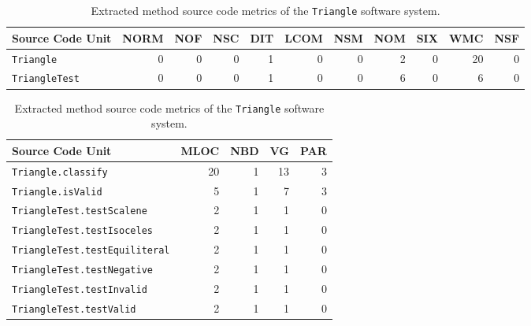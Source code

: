 \begin{table}
  \centering
  \caption{Extracted class source code metrics of the \texttt{Triangle} software system.}
  \label{tab:triangle_class_extracted_metrics}
	\begin{tabular}{|l|r|r|r|r|r|r|r|r|r|r|}
  	\hline
   	\rowcolor[RGB]{169,196,223}
  	\textbf{Source Code Unit} & \textbf{NORM} & \textbf{NOF} & \textbf{NSC} & \textbf{DIT} & \textbf{LCOM} & \textbf{NSM} & \textbf{NOM} & \textbf{SIX} & \textbf{WMC} & \textbf{NSF} \\
  	\hline \texttt{Triangle} & 0 & 0 & 0 & 1 & 0 & 0 & 2 & 0 & 20 & 0 \\
  	\hline \texttt{TriangleTest} & 0 & 0 & 0 & 1 & 0 & 0 & 6 & 0 & 6 & 0 \\
  	\hline
	\end{tabular}
  
  \vspace{3em}

  \centering
  \caption{Extracted method source code metrics of the \texttt{Triangle} software system.}
  \label{tab:triangle_method_extracted_metrics}
	\begin{tabular}{|l|r|r|r|r|}
  	\hline
  	\rowcolor[RGB]{169,196,223}
  	\textbf{Source Code Unit} & \textbf{MLOC} & \textbf{NBD} & \textbf{VG} & \textbf{PAR} \\
  	\hline \texttt{Triangle.classify} & 20 & 1 & 13 & 3 \\
  	\hline \texttt{Triangle.isValid} & 5 & 1 & 7 & 3 \\
  	\hline \texttt{TriangleTest.testScalene} & 2 & 1 & 1 & 0 \\
   	\hline \texttt{TriangleTest.testIsoceles} & 2 & 1 & 1 & 0 \\
  	\hline \texttt{TriangleTest.testEquiliteral} & 2 & 1 & 1 & 0 \\
  	\hline \texttt{TriangleTest.testNegative} & 2 & 1 & 1 & 0 \\
  	\hline \texttt{TriangleTest.testInvalid} & 2 & 1 & 1 & 0 \\
  	\hline \texttt{TriangleTest.testValid} & 2 & 1 & 1 & 0 \\
  	\hline
	\end{tabular}
\end{table}
\afterpage\clearpage


